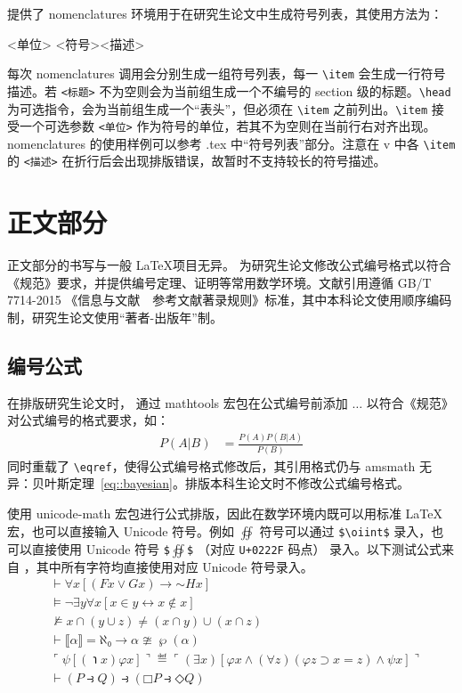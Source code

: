 \documentclass[master]{shtthesis}
\begin{document}
\shtthesis{} 提供了 nomenclatures 环境用于在研究生论文中生成符号列表，其使用方法为：
\begin{latex}
\begin{nomenclatures}[<标题>]
  \item[<单位>]{<符号>}{<描述>}
\end{nomenclatures}
\end{latex}
每次 nomenclatures 调用会分别生成一组符号列表，每一 \verb|\item| 会生成一行符号描述。若 \verb|<标题>| 不为空则会为当前组生成一个不编号的 section 级的标题。\verb|\head| 为可选指令，会为当前组生成一个“表头”，但必须在 \verb|\item| 之前列出。\verb|\item| 接受一个可选参数 \verb|<单位>| 作为符号的单位，若其不为空则在当前行右对齐出现。nomenclatures 的使用样例可以参考 \jobname.tex 中“符号列表”部分。注意在 \shtthesis{} v\version{} 中各 \verb|\item| 的 \verb|<描述>| 在折行后会出现排版错误，故暂时不支持较长的符号描述。

\section{正文部分}
\shtthesis{} 正文部分的书写与一般 \LaTeX 项目无异。\shtthesis{} 为研究生论文修改公式编号格式以符合《规范》要求，并提供编号定理、证明等常用数学环境。文献引用遵循 GB/T 7714-2015 《信息与文献　参考文献著录规则》标准，其中本科论文使用顺序编码制，研究生论文使用“著者-出版年”制。

\subsection{编号公式}
在排版研究生论文时，\shtthesis{} 通过 \textsf{mathtools} 宏包在公式编号前添加 $\ldots$ 以符合《规范》对公式编号的格式要求，如：
\begin{align}
P(A|B) &= \frac{P(A)P(B|A)}{P(B)} \label{eq::bayesian}
\end{align}
同时重载了 \verb|\eqref|，使得公式编号格式修改后，其引用格式仍与 \textsf{amsmath} 无异：贝叶斯定理~\eqref{eq::bayesian}。排版本科生论文时不修改公式编号格式。

\shtthesis{} 使用 \textsf{unicode-math} 宏包进行公式排版，因此在数学环境内既可以用标准 \LaTeX{} 宏，也可以直接输入 Unicode 符号。例如 $\oiint$ 符号可以通过 \verb|$\oiint$| 录入，也可以直接使用 Unicode 符号 \verb|$|$∯$\verb|$| （对应 \verb|U+0222F| 码点） 录入。以下测试公式来自 \citet{clerkma2013unicode}，其中所有字符均直接使用对应 Unicode 符号录入。
\begin{align}
& ⊢ ∀x[(Fx ∨ Gx) → \mathord{∼}Hx] \\
& ⊨ ¬∃y∀x[x∈y ↔ x∉x]  \\
& ⊭ x ∩ (y ∪ z) ≠ (x ∩ y) ∪ (x ∩ z) \\
& ⊢ ⟦α⟧ = ℵ₀ → α ≇ ℘(α) \\
& ⌜ψ[(℩x)φx]⌝ ≝ ⌜(∃x)[φx ∧ (∀z)(φz ⊃ x=z) ∧ ψx]⌝ \\
& ⊢ (P ⥽ Q) ⥽ (□P ⥽ ◇Q)
\end{align}
\end{document}
